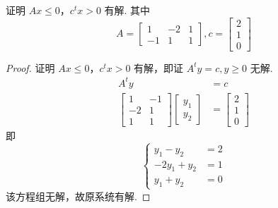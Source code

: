 \begin{example}
    证明 $Ax \le 0$，$c^tx > 0$ 有解. 其中
    \[
        A = \begin{bmatrix}
            1 & -2 & 1\\
            -1 & 1 & 1
        \end{bmatrix},
        c = \begin{bmatrix}
            2\\
            1\\
            0
        \end{bmatrix} 
    \]

    \begin{proof}
        证明 $Ax \le 0$，$c^tx > 0$ 有解，即证 $A^ty = c, y \ge 0$ 无解.
        \begin{align*}
            A^ty &= c\\
            \begin{bmatrix}
                1 & -1\\
                -2 & 1\\
                1 & 1
            \end{bmatrix}
            \begin{bmatrix}
                y_1\\
                y_2
            \end{bmatrix}
            &=\begin{bmatrix}
                2\\
                1\\
                0
            \end{bmatrix} 
        \end{align*}
        即 
        \[
            \begin{cases}
                y_1 - y_2 &= 2\\
                -2y_1 + y_2 &= 1\\
                y_1 + y_2 &= 0
            \end{cases}    
        \]
        该方程组无解，故原系统有解.
    \end{proof}
\end{example}

